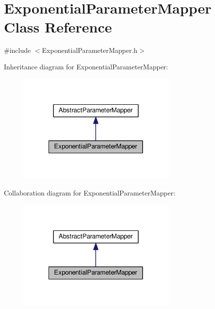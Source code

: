 \hypertarget{classExponentialParameterMapper}{}\section{Exponential\+Parameter\+Mapper Class Reference}
\label{classExponentialParameterMapper}


{\ttfamily \#include $<$Exponential\+Parameter\+Mapper.\+h$>$}



Inheritance diagram for Exponential\+Parameter\+Mapper\+:\nopagebreak
\begin{figure}[H]
\begin{center}
\leavevmode
\includegraphics[width=224pt]{classExponentialParameterMapper__inherit__graph}
\end{center}
\end{figure}


Collaboration diagram for Exponential\+Parameter\+Mapper\+:\nopagebreak
\begin{figure}[H]
\begin{center}
\leavevmode
\includegraphics[width=224pt]{classExponentialParameterMapper__coll__graph}
\end{center}
\end{figure}
